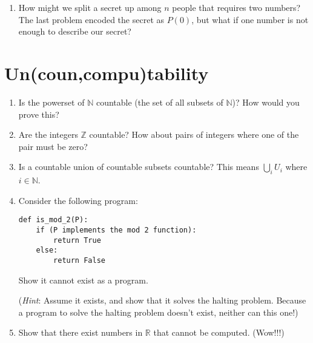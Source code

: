 \documentclass{article}
\begin{document}
\begin{enumerate}
        \begin{solution}
        \end{solution}
        \item How might we split a secret up among $n$ people that requires two numbers? The last problem encoded the secret as $P(0)$, but what if one number is not
        enough to describe our secret?
        \begin{solution}
        \end{solution}
    \end{enumerate}
    \section{Un(coun,compu)tability}
    \begin{enumerate}
        \item Is the powerset of $\mathbb{N}$ countable (the set of all subsets of $\mathbb{N}$)? How would you prove this?
        \begin{solution}
        \end{solution}
        \item Are the integers $\mathbb{Z}$ countable? How about pairs of integers where one of the pair must be zero?
        \begin{solution}
        \end{solution}
        \item Is a countable union of countable subsets countable? This means $\bigcup_{i} U_i$ where $i \in \mathbb{N}$.
        \begin{solution}
        \end{solution}
        \item Consider the following program: 
\begin{verbatim}        
def is_mod_2(P):
    if (P implements the mod 2 function):
        return True 
    else:
        return False
\end{verbatim}
Show it cannot exist as a program.

(\textit{Hint}: Assume it exists, and show that it solves the halting problem. Because a program to solve the halting problem doesn't exist, neither can this one!)
\begin{solution}
\end{solution}
    \item Show that there exist numbers in $\mathbb{R}$ that cannot be computed. (Wow!!!)
    \end{enumerate}
    
\end{document}
